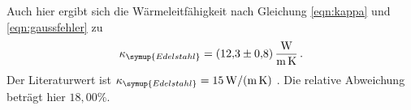 Auch hier ergibt sich die Wärmeleitfähigkeit nach Gleichung \eqref{eqn:kappa}
und \eqref{eqn:gaussfehler} zu
\begin{align}
  \kappa_{\symup{Edelstahl}} = \SI{12.3(08)}{\watt\per\meter\per\kelvin}\,.\nonumber
\end{align}
Der Literaturwert ist $\kappa_{\symup{Edelstahl}} = \SI{15}{\watt\per\meter\per\kelvin}$
\cite{Wärmeleitfähigkeit3}.
Die relative Abweichung beträgt hier $18,00\%$.
